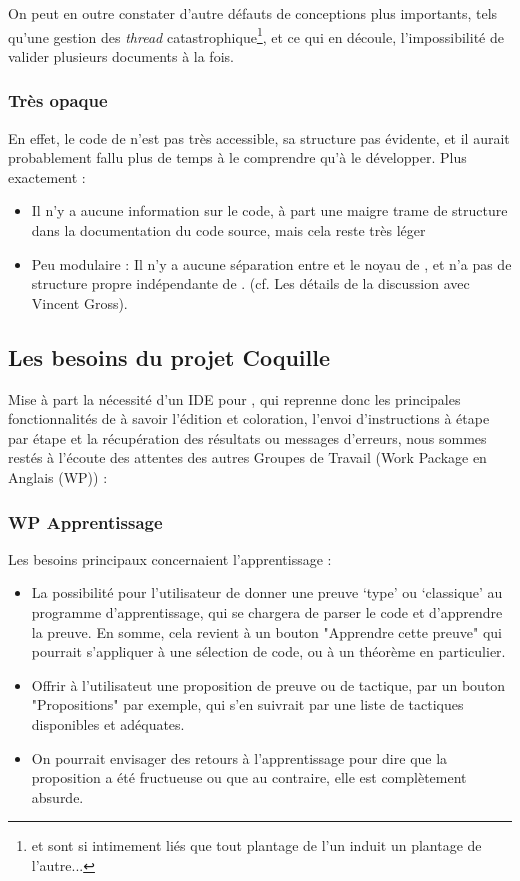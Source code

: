         On peut en outre constater d'autre défauts de conceptions plus importants, tels qu'une gestion des \emph{thread} catastrophique\footnote{\coqtop{} et \coqide{} sont si intimement liés que tout plantage de l'un induit un plantage de l'autre...}, et ce qui en découle, l'impossibilité de valider plusieurs documents à la fois.
			
        \subsubsection{Très opaque}

		En effet, le code de \coqide n'est pas très accessible, sa structure pas évidente, et il aurait probablement fallu plus de temps à le comprendre qu'à le développer. Plus exactement :
		\begin{itemize}
			\item Il n'y a aucune information sur le code, à part une maigre trame de structure dans la documentation du code source, mais cela reste très léger
			\item Peu modulaire : Il n'y a aucune séparation entre \coqide et le noyau de \coq, et \coqide n'a pas de structure propre indépendante de \coq. (cf. Les détails de la discussion avec Vincent Gross).	
		\end{itemize}
		
	\subsection{Les besoins du projet Coquille}

		Mise à part la nécessité d'un IDE pour \coq, qui reprenne donc les principales fonctionnalités de \coqide à savoir l'édition et coloration, l'envoi d'instructions à \coqtop étape par étape et la récupération des résultats ou messages d'erreurs, nous sommes restés à l'écoute des attentes des autres Groupes de Travail (Work Package en Anglais (WP)) :
        
        \subsubsection{WP Apprentissage}

        Les besoins principaux concernaient l'apprentissage :
		\begin{itemize}
			\item La possibilité pour l'utilisateur de donner une preuve `type' ou `classique' au programme d'apprentissage, qui se chargera de parser le code et d'apprendre la preuve. En somme, cela revient à un bouton "Apprendre cette preuve" qui pourrait s'appliquer à une sélection de code, ou à un théorème en particulier.
			\item Offrir à l'utilisateut une proposition de preuve ou de tactique, par un bouton "Propositions" par exemple, qui s'en suivrait par une liste de tactiques disponibles et adéquates.
			\item On pourrait envisager des retours à l'apprentissage pour dire que la proposition a été fructueuse ou que au contraire, elle est complètement absurde.
		\end{itemize}
			
